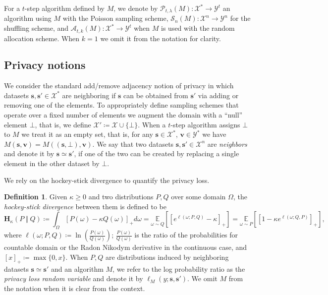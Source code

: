 \documentclass{article}
\newcommand{\Arxiv}[1]{}
\newcommand{\arxvFtnt}[1]{}
\newcommand{\Arxiv}[1]{#1}
\newcommand{\arxvFtnt}[1]{\footnote{#1}}
\theoremstyle{plain}
\theoremstyle{definition}
\newtheorem{definition}[theorem]{Definition}
\newcommand{\out}{y}
\newcommand{\outDom}{\mathcal{Y}}
\newcommand{\alg}{M}
\newcommand{\domain}{\mathcal{X}}
\newcommand{\dataset}{\boldsymbol{s}}
\newcommand{\view}{\boldsymbol{v}}
\newcommand{\expect}[2]{\underset{#1}{\mathbb{E}} \left[#2 \right]}
\newcommand{\loss}[3]{\ell\left(#1; #2, #3 \right)}
\newcommand{\lossAlg}[4]{\ell_{#1}\left(#2; #3, #4 \right)}
\newcommand{\HockeyStick}[1]{\boldsymbol{H}_{#1}}
\newcommand{\HockeyStickDiv}[3]{\HockeyStick{#1}\left(#2 ~\left\Vert~ #3 \right. \right)}
\newcommand{\Pois}[2]{\mathcal{P}_{#1}\left(#2\right)}
\newcommand{\shuf}[2]{\mathcal{S}_{#1}\left(#2\right)}
\newcommand{\alloc}[2]{\mathcal{A}_{#1}\left(#2\right)}
\begin{document}
For a $t$-step algorithm defined by $\alg$, we denote by $\Pois{t, \lambda}{\alg} : \domain^{*} \rightarrow \outDom^{t}$ an algorithm using $\alg$ with the Poisson sampling scheme, $\shuf{n}{\alg} : \domain^{n} \rightarrow \outDom^{n}$ for the shuffling scheme, and $\alloc{t, k}{\alg} : \domain^{*} \rightarrow \outDom^{t}$ when $\alg$ is used with the random allocation scheme. When $k = 1$ we omit it from the notation for clarity.

\subsection{Privacy notions}
We consider the standard add/remove adjacency notion of privacy in which datasets $\dataset, \dataset' \in \domain^{*}$ are neighboring if $\dataset$ can be obtained from $\dataset'$ via adding or removing one of the elements. To appropriately define sampling schemes that operate over a fixed number of elements we augment the domain with a ``null'' element $\bot$, that is, we define $\domain' \coloneqq \domain \cup \{\bot\}$.
When a $t$-step algorithm assigns $\bot$ to $\alg$ we treat it as an empty set, that is, for any $\dataset \in \domain^{*}$, $\view \in \outDom^{*}$ we have $\alg(\dataset, \view) = \alg((\dataset, \bot), \view)$.
We say that two datasets $\dataset, \dataset' \in \domain^{n}$ are \emph{neighbors} and denote it by $\dataset \simeq \dataset'$, if one of the two can be created by replacing a single element in the other dataset by $\bot$.

We rely on the hockey-stick divergence to quantify the privacy loss. 
\begin{definition}\Arxiv{[Hockey-stick divergence \cite{BKOZB12}]}\label{def:HSdiv}
    Given $\kappa \ge 0$ and two distributions $P, Q$ over some domain $\Omega$, the \emph{hockey-stick divergence} between them is defined to be
    \[
        \HockeyStickDiv{\kappa}{P}{Q} \coloneqq \int_{\Omega} \left[P(\omega) - \kappa Q(\omega) \right]_{+} d\omega = \expect{\omega \sim Q}{\left[e^{\loss{\omega}{P}{Q}} - \kappa \right]_{+}} = \expect{\omega \sim P}{\left[1 - \kappa e^{\loss{\omega}{Q}{P}} \right]_{+}},
    \]
    where $\loss{\omega}{P}{Q} \coloneqq \ln \left(\frac{P(\omega)}{Q(\omega)}\right)$; $\frac{P(\omega)}{Q(\omega)}$ is the ratio of the probabilities for countable domain or the Radon Nikodym derivative in the continuous case, and $\left[x \right]_{+} \coloneqq \max\{0, x\}$.\arxvFtnt{Despite its name, the hockey-stick divergence is actually not a true divergence under the common definition, since it does not satisfy part of the positivity condition which requires that the divergence is equal to $0$ only for two distributions that are identical almost everywhere, because it is not strictly convex at $1$. This has no effect on our results, since we don't use any claim that is based on this property of divergences.}
    When $P, Q$ are distributions induced by neighboring datasets $\dataset \simeq \dataset'$ and an algorithm $\alg$, we refer to the log probability ratio as the \emph{privacy loss random variable} and denote it by $\lossAlg{\alg}{\out}{\dataset}{\dataset'}$. We omit $\alg$ from the notation when it is clear from the context.
\end{definition}
\end{document}
